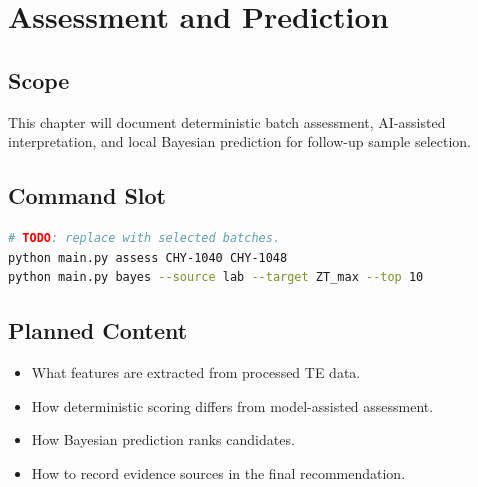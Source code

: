 \chapter{Assessment and Prediction}

\section{Scope}

This chapter will document deterministic batch assessment, AI-assisted
interpretation, and local Bayesian prediction for follow-up sample selection.

\section{Command Slot}

\begin{lstlisting}[language=bash,caption={Assessment and prediction command slot.}]
# TODO: replace with selected batches.
python main.py assess CHY-1040 CHY-1048
python main.py bayes --source lab --target ZT_max --top 10
\end{lstlisting}

\section{Planned Content}

\begin{itemize}[leftmargin=*]
  \item What features are extracted from processed TE data.
  \item How deterministic scoring differs from model-assisted assessment.
  \item How Bayesian prediction ranks candidates.
  \item How to record evidence sources in the final recommendation.
\end{itemize}

